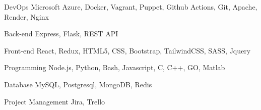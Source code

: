 
\begin{cvskills}

  \cvskill
  {DevOps} %
  {Microsoft Azure, Docker, Vagrant, Puppet, Github Actions, Git, Apache, Render, Nginx} %

  \cvskill
  {Back-end} %
  {Express, Flask, REST API} %

  \cvskill
  {Front-end} %
  {React, Redux, HTML5, CSS, Bootstrap, TailwindCSS, SASS, Jquery}

  \cvskill
  {Programming} %
  {Node.js, Python, Bash, Javascript, C, C++, GO, Matlab} %

  \cvskill
  {Database} %
  {MySQL, Postgresql, MongoDB, Redis} %

  \cvskill
  {Project Management} %
  {Jira, Trello} %

\end{cvskills}
